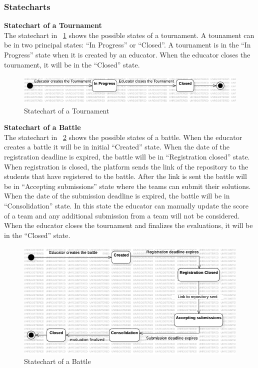 \subsubsection{Statecharts}

\textbf{Statechart of a Tournament} \\
The statechart in \figurename~\ref{fig:statechart_tournament} shows the possible states of a tournament. A tounament can be in two principal states: ``In Progress'' or ``Closed''. A tournament is in the ``In Progress'' state when it is created by an educator. When the educator closes the tournament, it will be in the ``Closed'' state.
\begin{figure}[H]
    \centering
    \includegraphics[width=1\textwidth]{Diagrams/TournamentStateChart.jpg}
    \caption{Statechart of a Tournament}
    \label{fig:statechart_tournament}
\end{figure}
\textbf{Statechart of a Battle} \\
The statechart in \figurename~\ref{fig:statechart_battle} shows the possible states of a battle. When the educator creates a battle it will be in initial ``Created'' state. When the date of the registration deadline is expired, the battle will be in ``Registration closed'' state. When registration is closed, the platform sends the link of the repository to the students that have registered to the battle. After the link is sent the battle will be in ``Accepting submissions'' state where the teams can submit their solutions. When the date of the submission deadline is expired, the battle will be in ``Consolidation'' state. In this state the educator can manually update the score of a team and any additional submission from a team will not be considered. When the educator closes  the tournament and finalizes the evaluations, it will be in the ``Closed'' state.
\begin{figure}[H]
    \centering
    \includegraphics[width=1\textwidth]{Diagrams/BattleStateChart.jpg}
    \caption{Statechart of a Battle}
    \label{fig:statechart_battle}
\end{figure}

